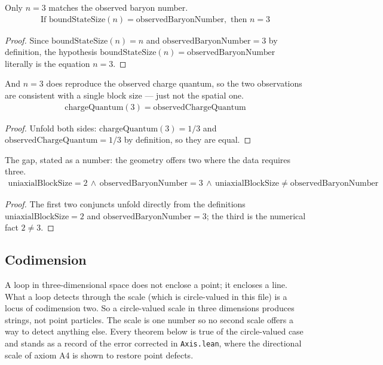 \begin{theorem}
Only $n = 3$ matches the observed baryon number.
\begin{align*}
\text{If } \text{boundStateSize}(n) = \text{observedBaryonNumber}, \text{ then } n = 3
\end{align*}
\begin{proof}
Since $\text{boundStateSize}(n)=n$ and $\text{observedBaryonNumber}=3$ by definition, the hypothesis $\text{boundStateSize}(n)=\text{observedBaryonNumber}$ literally is the equation $n=3$.
\end{proof}
\end{theorem}

\begin{theorem}
And $n = 3$ does reproduce the observed charge quantum, so the two observations are consistent with a single block size — just not the spatial one.
\begin{align*}
\text{chargeQuantum}(3) = \text{observedChargeQuantum}
\end{align*}
\begin{proof}
Unfold both sides: $\text{chargeQuantum}(3)=1/3$ and $\text{observedChargeQuantum}=1/3$ by definition, so they are equal.
\end{proof}
\end{theorem}

\begin{theorem}
The gap, stated as a number: the geometry offers two where the data requires three.
\begin{align*}
\text{uniaxialBlockSize} = 2 \,\wedge\, \text{observedBaryonNumber} = 3 \,\wedge\, \text{uniaxialBlockSize} \neq \text{observedBaryonNumber}
\end{align*}
\begin{proof}
The first two conjuncts unfold directly from the definitions $\text{uniaxialBlockSize}=2$ and $\text{observedBaryonNumber}=3$; the third is the numerical fact $2\neq3$.
\end{proof}
\end{theorem}

\subsection{Codimension}

A loop in three-dimensional space does not enclose a point; it encloses a line.  What a loop detects through the scale (which is circle-valued in this file) is a locus of codimension two.  So a circle-valued scale in three dimensions produces strings, not point particles.  The scale is one number so no second scale offers a way to detect anything else.  Every theorem below is true of the circle-valued case and stands as a record of the error corrected in \texttt{Axis.lean}, where the directional scale of axiom A4 is shown to restore point defects.

